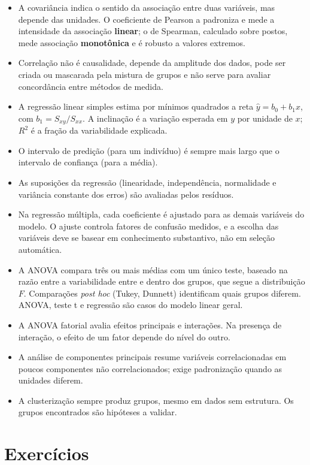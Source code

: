 \documentclass[
]{book}
\providecommand{\tightlist}{%
  \setlength{\itemsep}{0pt}\setlength{\parskip}{0pt}}
\begin{document}
\begin{itemize}
\tightlist
\item
  A covariância indica o sentido da associação entre duas variáveis, mas depende das unidades. O coeficiente de Pearson a padroniza e mede a intensidade da associação \textbf{linear}; o de Spearman, calculado sobre postos, mede associação \textbf{monotônica} e é robusto a valores extremos.
\item
  Correlação não é causalidade, depende da amplitude dos dados, pode ser criada ou mascarada pela mistura de grupos e não serve para avaliar concordância entre métodos de medida.
\item
  A regressão linear simples estima por mínimos quadrados a reta \(\hat{y} = b_0 + b_1 x\), com \(b_1 = S_{xy}/S_{xx}\). A inclinação é a variação esperada em \(y\) por unidade de \(x\); \(R^2\) é a fração da variabilidade explicada.
\item
  O intervalo de predição (para um indivíduo) é sempre mais largo que o intervalo de confiança (para a média).
\item
  As suposições da regressão (linearidade, independência, normalidade e variância constante dos erros) são avaliadas pelos resíduos.
\item
  Na regressão múltipla, cada coeficiente é ajustado para as demais variáveis do modelo. O ajuste controla fatores de confusão medidos, e a escolha das variáveis deve se basear em conhecimento substantivo, não em seleção automática.
\item
  A ANOVA compara três ou mais médias com um único teste, baseado na razão entre a variabilidade entre e dentro dos grupos, que segue a distribuição \(F\). Comparações \emph{post hoc} (Tukey, Dunnett) identificam quais grupos diferem. ANOVA, teste t e regressão são casos do modelo linear geral.
\item
  A ANOVA fatorial avalia efeitos principais e interações. Na presença de interação, o efeito de um fator depende do nível do outro.
\item
  A análise de componentes principais resume variáveis correlacionadas em poucos componentes não correlacionados; exige padronização quando as unidades diferem.
\item
  A clusterização sempre produz grupos, mesmo em dados sem estrutura. Os grupos encontrados são hipóteses a validar.
\end{itemize}

\section{Exercícios}\label{exercuxedcios-5}
\end{document}
